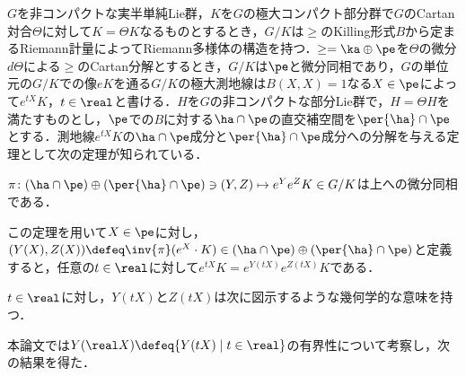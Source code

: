 $G$を非コンパクトな実半単純Lie群，$K$を$G$の極大コンパクト部分群で$G$のCartan対合$\Theta$に対して$K = \Theta K $なるものとするとき，$G/K$は$\ge$のKilling形式$B$から定まるRiemann計量によってRiemann多様体の構造を持つ．$\ge = \ka \oplus \pe $を$\Theta$の微分$d\Theta$による$\ge$のCartan分解とするとき，$G/K$は$\pe$と微分同相であり，$G$の単位元の$G/K$での像$eK$を通る$G/K$の極大測地線は$B(X, X) = 1 $なる$X\in \pe$によって$e^{tX}K $，$t\in \real$と書ける．$H$を$G$の非コンパクトな部分Lie群で，$H = \Theta H$を満たすものとし，$\pe$での$B$に対する$\ha\cap \pe$の直交補空間を$\per{\ha}\cap\pe$とする．測地線$e^{tX}K$の$\ha\cap\pe$成分と$\per{\ha}\cap\pe$成分への分解を与える定理として次の定理が知られている．

\begin{thm*}\cite[Lemma~6.1]{kob89}\label{thm:kob89-lem6.1}

  $\pi\colon  (\ha\cap\pe)\oplus (\per{\ha}\cap \pe) \ni (Y, Z)\mapsto e^{Y}e^{Z}K \in G/K $は上への微分同相である．
\end{thm*}
この定理を用いて$X\in \pe$に対し，$(Y(X), Z(X))\defeq \inv{\pi}(e^X\cdot K)\in (\ha\cap\pe)\oplus (\per{\ha}\cap \pe)$と定義すると，任意の$t\in \real$に対して$e^{tX}K = e^{Y(tX)}e^{Z(tX)}K $である．

$t\in \real$に対し，$Y(tX) $と$Z(tX) $は次に図示するような幾何学的な意味を持つ．

本論文では$Y(\real X)\defeq \{Y(tX)\mid t\in \real \} $の有界性について考察し，次の結果を得た．
\begin{thm*}
  
\end{thm*}